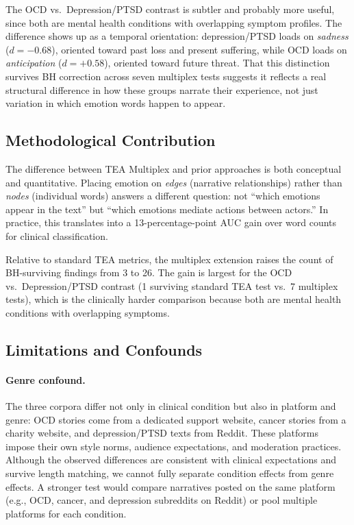 \documentclass[11pt,a4paper]{article}
\begin{document}
The OCD vs.\ Depression/PTSD contrast is subtler and probably more useful, since both are mental health conditions with overlapping symptom profiles.  The difference shows up as a temporal orientation: depression/PTSD loads on \textit{sadness} ($d=-0.68$), oriented toward past loss and present suffering, while OCD loads on \textit{anticipation} ($d=+0.58$), oriented toward future threat.  That this distinction survives BH correction across seven multiplex tests suggests it reflects a real structural difference in how these groups narrate their experience, not just variation in which emotion words happen to appear.

\subsection{Methodological Contribution}

The difference between TEA Multiplex and prior approaches is both conceptual and quantitative.  Placing emotion on \textit{edges} (narrative relationships) rather than \textit{nodes} (individual words) answers a different question: not ``which emotions appear in the text'' but ``which emotions mediate actions between actors.''  In practice, this translates into a 13-percentage-point AUC gain over word counts for clinical classification.

Relative to standard TEA metrics, the multiplex extension raises the count of BH-surviving findings from 3 to 26.  The gain is largest for the OCD vs.\ Depression/PTSD contrast (1 surviving standard TEA test vs.\ 7 multiplex tests), which is the clinically harder comparison because both are mental health conditions with overlapping symptoms.

\subsection{Limitations and Confounds}

\paragraph{Genre confound.}  The three corpora differ not only in clinical condition but also in platform and genre: OCD stories come from a dedicated support website, cancer stories from a charity website, and depression/PTSD texts from Reddit.  These platforms impose their own style norms, audience expectations, and moderation practices.  Although the observed differences are consistent with clinical expectations and survive length matching, we cannot fully separate condition effects from genre effects.  A stronger test would compare narratives posted on the same platform (e.g., OCD, cancer, and depression subreddits on Reddit) or pool multiple platforms for each condition.
\end{document}
